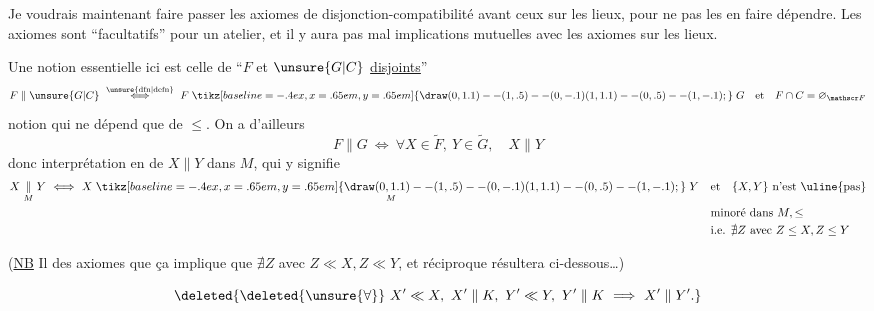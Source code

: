 Je voudrais maintenant faire passer les axiomes de disjonction-compatibilité avant ceux sur les lieux, pour ne pas  les en faire dépendre. Les axiomes sont ``facultatifs'' pour un atelier, et il y aura pas mal  implications mutuelles avec les axiomes sur les lieux.

Une notion essentielle ici est celle de ``$F$ et $\unsure{G|C}$ \uline{disjoints}''
\[
 F\parallel\unsure{G|C}\ \overset{\unsure{\mathrm{dfn}|\mathrm{defn}}}{\Longleftrightarrow}\ F\mathrel{\tikz[baseline=-.4ex,x=.65em,y=.65em]{\draw (0,1.1)--(1,.5)--(0,-.1) (1,1.1)--(0,.5)--(1,-.1);}}G\quad\text{et}\quad F\cap C=\varnothing_{\mathscr F}
\]
notion qui ne dépend que de $\leq$. On a d'ailleurs
\[
 F\parallel G\ \Longleftrightarrow\ \forall X\in\widetilde F,\ Y\in\widetilde G,\quad X\parallel Y
\]
donc interprétation en  de $X\parallel Y$ dans $M$, qui y signifie
\[
\begin{aligned}
X\mathrel{\underset{M}{\parallel}}Y\ \Longleftrightarrow\
 X\mathrel{\underset{M}{\mathrel{\tikz[baseline=-.4ex,x=.65em,y=.65em]{\draw (0,1.1)--(1,.5)--(0,-.1) (1,1.1)--(0,.5)--(1,-.1);}}}}Y\quad &\text{et}\quad\{X,Y\}\ \text{n'est \uline{pas}}\\
&\text{minoré dans } M,\leq\\
&\text{i.e. }\nexists Z\ \text{avec }Z\leq X,Z\leq Y
\end{aligned}
\]

(\uline{NB} Il  des axiomes  que ça implique que $\nexists Z$ avec $Z\ll X,Z\ll Y$,  et  réciproque résultera  ci-dessous\ldots)

%
\[
\deleted{\deleted{\unsure{\forall}}\ X'\ll X,\ X'\parallel K,\ Y'\ll Y,\ Y'\parallel K\ \Longrightarrow\ X'\parallel Y'.}
\]

